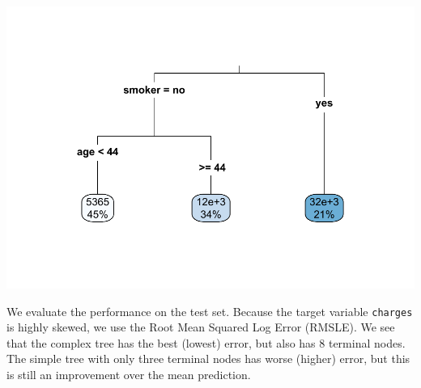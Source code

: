 \documentclass[openany]{book}
\newenvironment{Shaded}{\begin{snugshade}}{\end{snugshade}}
\newcommand{\DataTypeTok}[1]{\textcolor[rgb]{0.13,0.29,0.53}{#1}}
\newcommand{\DecValTok}[1]{\textcolor[rgb]{0.00,0.00,0.81}{#1}}
\newcommand{\FloatTok}[1]{\textcolor[rgb]{0.00,0.00,0.81}{#1}}
\newcommand{\KeywordTok}[1]{\textcolor[rgb]{0.13,0.29,0.53}{\textbf{#1}}}
\newcommand{\NormalTok}[1]{#1}
\newcommand{\OperatorTok}[1]{\textcolor[rgb]{0.81,0.36,0.00}{\textbf{#1}}}
\newcommand{\StringTok}[1]{\textcolor[rgb]{0.31,0.60,0.02}{#1}}
\begin{document}
\begin{Shaded}
\end{Shaded}

\includegraphics{06-tree-based-models_files/figure-latex/unnamed-chunk-9-1.pdf}

We evaluate the performance on the test set. Because the target variable \texttt{charges} is highly skewed, we use the Root Mean Squared Log Error (RMSLE). We see that the complex tree has the best (lowest) error, but also has 8 terminal nodes. The simple tree with only three terminal nodes has worse (higher) error, but this is still an improvement over the mean prediction.
\end{document}
